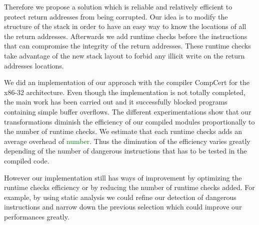 \documentclass[11pt]{sdm}
\begin{document}
Therefore we propose a solution which is reliable and relatively efficient to protect return addresses from being corrupted. Our idea is to modify the structure of the stack in order to have an easy way to know the locations of all the return addresses. Afterwards we add runtime checks before the instructions that can compromise the integrity of the return addresses. These runtime checks take advantage of the new stack layout to forbid any illicit write on the return addresses locations.

We did an implementation of our approach with the compiler CompCert for the x86-32 architecture. Even though the implementation is not totally completed, the main work has been carried out and it successfully blocked programs containing simple buffer overflows. The different experimentations show that our transformations diminish the efficiency of our compiled modules proportionally to the number of runtime checks. We estimate that each runtime checks adds an average overhead of \textcolor{green}{number}. Thus the diminution of the efficiency varies greatly depending of the number of dangerous instructions that has to be tested in the compiled code.

However our implementation still has ways of improvement by optimizing the runtime checks efficiency or by reducing the number of runtime checks added. For example, by using static analysis we could refine our detection of dangerous instructions and narrow down the previous selection which could improve our performances greatly.


\newpage


\end{document}
